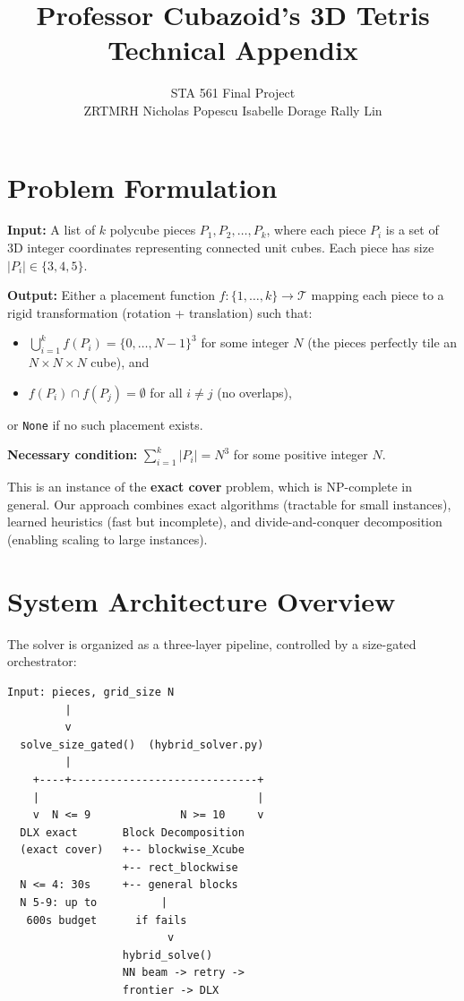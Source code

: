 \documentclass[11pt]{article}
\title{\textbf{Professor Cubazoid's 3D Tetris}\\[0.3em]
\large Technical Appendix}
\author{STA 561 Final Project\\[0.3em]
ZRTMRH \quad Nicholas Popescu \quad Isabelle Dorage \quad Rally Lin}
\date{}
\begin{document}
\maketitle

\tableofcontents
\newpage

\section{Problem Formulation}

\textbf{Input:} A list of $k$ polycube pieces $P_1, P_2, \ldots, P_k$, where each piece $P_i$ is a set of 3D integer coordinates representing connected unit cubes. Each piece has size $|P_i| \in \{3, 4, 5\}$.

\textbf{Output:} Either a placement function $f: \{1, \ldots, k\} \to \mathcal{T}$ mapping each piece to a rigid transformation (rotation + translation) such that:
\begin{itemize}[nosep]
  \item $\bigcup_{i=1}^{k} f(P_i) = \{0, \ldots, N{-}1\}^3$ for some integer $N$ (the pieces perfectly tile an $N \times N \times N$ cube), and
  \item $f(P_i) \cap f(P_j) = \emptyset$ for all $i \neq j$ (no overlaps),
\end{itemize}
or \texttt{None} if no such placement exists.

\textbf{Necessary condition:} $\sum_{i=1}^{k} |P_i| = N^3$ for some positive integer $N$.

This is an instance of the \textbf{exact cover} problem, which is NP-complete in general. Our approach combines exact algorithms (tractable for small instances), learned heuristics (fast but incomplete), and divide-and-conquer decomposition (enabling scaling to large instances).

\section{System Architecture Overview}

The solver is organized as a three-layer pipeline, controlled by a size-gated orchestrator:

\begin{verbatim}
Input: pieces, grid_size N
         |
         v
  solve_size_gated()  (hybrid_solver.py)
         |
    +----+-----------------------------+
    |                                  |
    v  N <= 9              N >= 10     v
  DLX exact       Block Decomposition
  (exact cover)   +-- blockwise_Xcube
                  +-- rect_blockwise
  N <= 4: 30s     +-- general blocks
  N 5-9: up to          |
   600s budget      if fails
                         v
                  hybrid_solve()
                  NN beam -> retry ->
                  frontier -> DLX
\end{verbatim}
\end{document}
